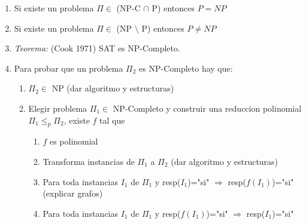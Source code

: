 \documentclass[a4paper, 11pt]{article}
\begin{document}
\begin{enumerate}
\item Si existe un problema $\Pi \in$ (NP-C $\cap$ P) entonces $P=NP$
\item Si existe un problema $\Pi \in$ (NP $\setminus$ P) entonces $P\neq NP$
\item \textit{Teorema:} (Cook 1971) SAT es NP-Completo.
\item Para probar que un problema $\Pi_{2}$ es NP-Completo hay que:
   \begin{enumerate}
   \item $\Pi_{2} \in$ NP (dar algoritmo y estructuras)
   \item Elegir problema $\Pi_{1} \in$ NP-Completo y construir una reduccion polinomial $\Pi_{1} \leq_{p} \Pi_{2}$, existe $f$ tal que
      \begin{enumerate}
      \item $f$ es polinomial
      \item Transforma instancias de $\Pi_{1}$ a $\Pi_{2}$ (dar algoritmo y estructuras)
      \item Para toda instancias $I_{1}$ de $\Pi_{1}$ y resp($I_{1}$)="si" $\Rightarrow$ resp($f(I_{1})$)="si" (explicar grafos)
      \item Para toda instancias $I_{1}$ de $\Pi_{1}$ y resp($f(I_{1})$)="si" $\Rightarrow$ resp($I_{1}$)="si"
      \end{enumerate}
   \end{enumerate}
\end{enumerate}
\end{document}
